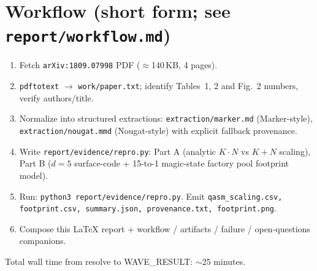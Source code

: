 \section{Workflow (short form; see \texttt{report/workflow.md})}
\begin{enumerate}
  \item Fetch \texttt{arXiv:1809.07998} PDF ($\approx$140\,KB, 4 pages).
  \item \texttt{pdftotext} $\to$ \texttt{work/paper.txt}; identify Tables~1, 2 and Fig.~2 numbers, verify authors/title.
  \item Normalize into structured extractions: \texttt{extraction/marker.md} (Marker-style), \texttt{extraction/nougat.mmd} (Nougat-style) with explicit fallback provenance.
  \item Write \texttt{report/evidence/repro.py}: Part A (analytic $K\cdot N$ vs $K+N$ scaling), Part B ($d=5$ surface-code + 15-to-1 magic-state factory pool footprint model).
  \item Run: \texttt{python3 report/evidence/repro.py}. Emit \texttt{qasm\_scaling.csv, footprint.csv, summary.json, provenance.txt, footprint.png}.
  \item Compose this LaTeX report + workflow / artifacts / failure / open-questions companions.
\end{enumerate}
Total wall time from resolve to WAVE\_RESULT: $\sim$25 minutes.
